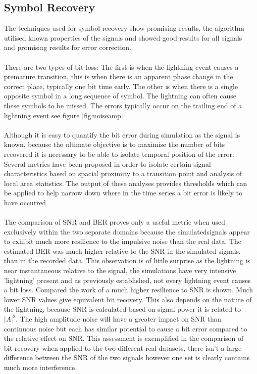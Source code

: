 \subsection{Symbol Recovery}
The techniques used for symbol recovery show promising results, the algorithm utilised known properties of the signals and showed good results for all signals and promising results for error correction.
\\\\
There are two types of bit loss: The first is when the lightning event causes a premature transition, this is when there is an apparent phase change in the correct place, typically one bit time early. The other is when there is a single opposite symbol in a long sequence of symbol. The lightning can often cause these symbols to be missed. The errors typically occur on the trailing end of a lightning event see figure \ref{fig:noiseamp}.
\\\\
Although it is easy to quantify the bit error during simulation as the signal is known, because the ultimate objective is to maximise the number of bits recovered it is necessary to be able to isolate temporal position of the error. Several metrics have been proposed in order to isolate certain signal characteristics based on spacial proximity to a transition point and analysis of local area statistics. The output of these analyses provides thresholds which can be applied to help narrow down where in the time series a bit error is likely to have occurred.
\\\\
The comparison of SNR and BER proves only a useful metric when used exclusively within the two separate domains because the simulatedsignals appear to exhibit much more resilience to the impulsive noise than the real data. 
The estimated BER was much higher relative to the SNR in the simulated signals, than in the recorded data. This observation is of little surprise as the lightning is near instantaneous relative to the signal, the simulations have very intensive 'lightning' present and as previously established, not every lightning event causes a bit loss. Compared the work of \cite{Yang2016} a much higher resilience to SNR is shown. Much lower SNR values give equivalent bit recovery. This also depends on the nature of the lightning, because SNR is calculated based on signal power it is related to $|A|^2$. The high amplitude noise will have a greater impact on SNR than continuous noise but each has similar potential to cause a bit error compared to the relative effect on SNR. This assessment is exemplified in the comparison of bit recovery when applied to the two different real datasets, there isn't a large difference between the SNR of the two signals however one set is clearly contains much more interference. 

